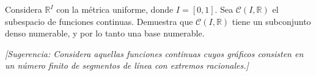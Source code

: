  \item Considera $\mathbb{R}^{I}$ con la métrica uniforme, donde $I = [0,1]$.  
    Sea $\mathcal{C}(I, \mathbb{R})$ el subespacio de funciones continuas. Demuestra que $\mathcal{C}(I, \mathbb{R})$ tiene un subconjunto denso numerable, y por lo tanto una base numerable.  

    \textit{[Sugerencia: Considera aquellas funciones continuas cuyos gráficos consisten en un número finito de segmentos de línea con extremos racionales.]}